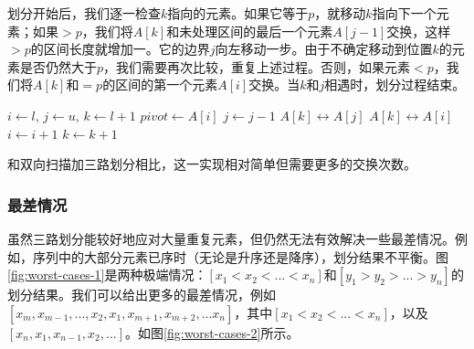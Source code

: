 \documentclass[b5paper]{ctexart}
\begin{document}
划分开始后，我们逐一检查$k$指向的元素。如果它等于$p$，就移动$k$指向下一个元素；如果$> p$，我们将$A[k]$和未处理区间的最后一个元素$A[j-1]$交换，这样$> p$的区间长度就增加一。它的边界$j$向左移动一步。由于不确定移动到位置$k$的元素是否仍然大于$p$，我们需要再次比较，重复上述过程。否则，如果元素$< p$，我们将$A[k]$和$= p$的区间的第一个元素$A[i]$交换。当$k$和$j$相遇时，划分过程结束。

\begin{algorithmic}[1]
    \State $i \gets l$, $j \gets u$, $k \gets l + 1$
    \State $pivot \gets A[i]$
        \State $j \gets j - 1$
        \State {} $A[k] \leftrightarrow A[j]$
      \EndWhile
        \State {} $A[k] \leftrightarrow A[i]$
        \State $i \gets i + 1$
      \EndIf
      \State $k \gets k + 1$
    \EndWhile
    \State {}
    \State {}
  \EndIf
\EndProcedure
\end{algorithmic}

和双向扫描加三路划分相比，这一实现相对简单但需要更多的交换次数。

\subsubsection{最差情况}

虽然三路划分能较好地应对大量重复元素，但仍然无法有效解决一些最差情况。例如，序列中的大部分元素已序时（无论是升序还是降序），划分结果不平衡。图\ref{fig:worst-cases-1}是两种极端情况：$[x_1 < x_2 < ... < x_n]$和$[y_1 > y_2 > ... > y_n]$的划分结果。我们可以给出更多的最差情况，例如$[x_m, x_{m-1}, ..., x_2, x_1, x_{m+1}, x_{m+2}, ... x_n]$，其中$[ x_1 < x_2 < ... < x_n]$，以及$[x_n, x_1, x_{n-1}, x_2, ... ]$。如图\ref{fig:worst-cases-2}所示。
\end{document}
